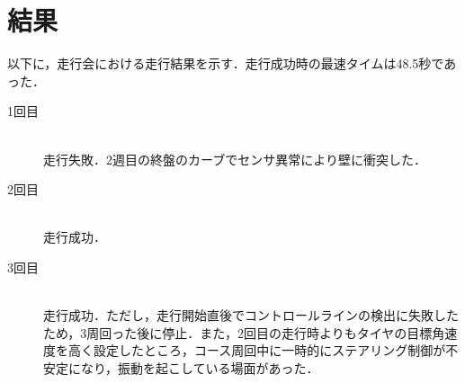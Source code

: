 \section{結果}
以下に，走行会における走行結果を示す．走行成功時の最速タイムは48.5秒であった．
\begin{description}

    \item[1回目] \mbox{} \\
      走行失敗．2週目の終盤のカーブでセンサ異常により壁に衝突した．
      
    \item[2回目] \mbox{} \\
      走行成功．

    \item[3回目] \mbox{} \\
      走行成功．ただし，走行開始直後でコントロールラインの検出に失敗したため，3周回った後に停止．また，2回目の走行時よりもタイヤの目標角速度を高く設定したところ，コース周回中に一時的にステアリング制御が不安定になり，振動を起こしている場面があった．


  \end{description}